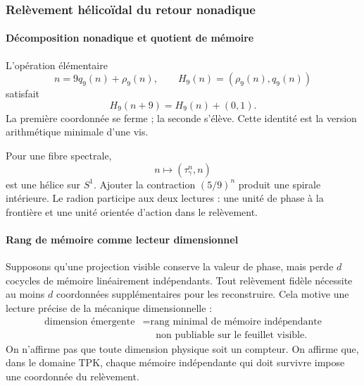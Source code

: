 \subsubsection{Relèvement hélicoïdal du retour nonadique}

\paragraph{Décomposition nonadique et quotient de mémoire}

L'opération élémentaire
\begin{equation}
n=9q_9(n)+\rho_9(n),
\qquad
H_9(n)=(\rho_9(n),q_9(n))
\label{eq:H9}
\end{equation}
satisfait
\begin{equation}
H_9(n+9)=H_9(n)+(0,1).
\label{eq:H9-helix}
\end{equation}
La première coordonnée se ferme ; la seconde s'élève. Cette identité est la
version arithmétique minimale d'une vis.

Pour une fibre spectrale,
\[
n\longmapsto(\tau_\gamma^n,n)
\]
est une hélice sur \(S^1\). Ajouter la contraction \((5/9)^n\) produit une
spirale intérieure. Le radion participe aux deux lectures : une unité de phase
à la frontière et une unité orientée d'action dans le relèvement.

\paragraph{Rang de mémoire comme lecteur dimensionnel}

Supposons qu'une projection visible conserve la valeur de phase, mais perde
\(d\) cocycles de mémoire linéairement indépendants. Tout relèvement fidèle
nécessite au moins \(d\) coordonnées supplémentaires pour les reconstruire. Cela
motive une lecture précise de la mécanique dimensionnelle :
\begin{equation}
\begin{aligned}
\text{dimension émergente}
&=\text{rang minimal de mémoire indépendante}\\
&\phantom{=}\text{non publiable sur le feuillet visible}.
\end{aligned}
\label{eq:dimension-memory}
\end{equation}
On n'affirme pas que toute dimension physique soit un compteur. On affirme que, dans le
domaine TPK, chaque mémoire indépendante qui doit survivre impose une
coordonnée du relèvement.

